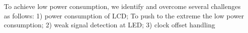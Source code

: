 


To achieve low power consumption, we identify and overcome several challenges as follows: 1) power consumption of LCD; To push to the extreme the low power consumption; 2) weak signal detection at LED; 3) clock offset handling


